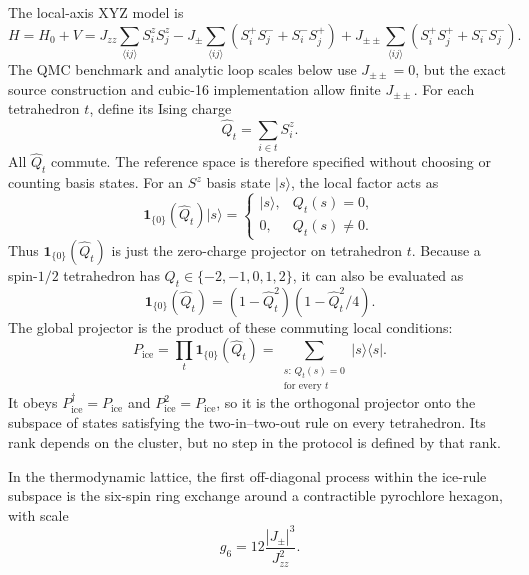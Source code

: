 \documentclass[11pt]{article}
\newcommand{\Jzz}{J_{zz}}
\newcommand{\Jpm}{J_{\pm}}
\newcommand{\Jpp}{J_{\pm\pm}}
\newcommand{\Pice}{P_{\mathrm{ice}}}
\begin{document}
The local-axis XYZ model is
\begin{equation}
 H=H_0+V=
 \Jzz\sum_{\langle ij\rangle}S_i^zS_j^z
 -\Jpm\sum_{\langle ij\rangle}
 \left(S_i^+S_j^-+S_i^-S_j^+\right)
 +\Jpp\sum_{\langle ij\rangle}
 \left(S_i^+S_j^++S_i^-S_j^-\right).
 \label{eq:model}
\end{equation}
The QMC benchmark and analytic loop scales below use $\Jpp=0$, but the exact
source construction and cubic-16 implementation allow finite $\Jpp$.
For each tetrahedron $t$, define its Ising charge
\begin{equation}
 \widehat Q_t=\sum_{i\in t}S_i^z .
\end{equation}
All $\widehat Q_t$ commute.  The reference space is therefore specified
without choosing or counting basis states.  For an $S^z$ basis state
$|s\rangle$, the local factor acts as
\begin{equation}
 \mathbf 1_{\{0\}}(\widehat Q_t)|s\rangle=
 \begin{cases}
  |s\rangle,&Q_t(s)=0,\\
  0,&Q_t(s)\ne0.
 \end{cases}
\end{equation}
Thus $\mathbf 1_{\{0\}}(\widehat Q_t)$ is just the zero-charge projector on
tetrahedron $t$.  Because a spin-$1/2$ tetrahedron has
$Q_t\in\{-2,-1,0,1,2\}$, it can also be evaluated as
\begin{equation}
 \mathbf 1_{\{0\}}(\widehat Q_t)
 =(1-\widehat Q_t^2)(1-\widehat Q_t^2/4).
\end{equation}
The global projector is the product of these commuting local conditions:
\begin{equation}
 \Pice=\prod_t \mathbf 1_{\{0\}}(\widehat Q_t)
 =\sum_{\substack{s:\,Q_t(s)=0\\\text{for every }t}}|s\rangle\langle s|.
 \label{eq:iceprojector}
\end{equation}
It obeys $\Pice^\dagger=\Pice$ and $\Pice^2=\Pice$, so it is the orthogonal
projector onto the subspace of states satisfying the two-in--two-out rule on
every tetrahedron.  Its rank depends on the cluster, but no step in the
protocol is defined by that rank.

In the thermodynamic lattice, the first off-diagonal process within
the ice-rule subspace is the six-spin ring exchange around a contractible
pyrochlore hexagon, with scale
\begin{equation}
 g_6=12\frac{|\Jpm|^3}{\Jzz^2}.
\end{equation}
\end{document}
